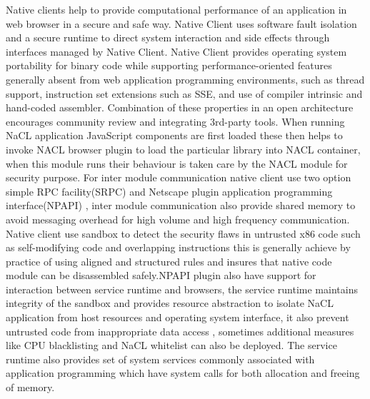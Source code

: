 \documentclass[23pt]{article}
\begin{document}
{\Large Native clients help to provide computational performance of an application in web browser in a secure and safe way. Native Client uses software fault isolation and a secure runtime to direct system interaction and side effects through interfaces managed by Native Client. Native Client provides operating system portability for binary code while supporting performance-oriented features generally absent from web application programming environments, such as thread support, instruction set extensions such as SSE, and use of compiler intrinsic and hand-coded assembler. Combination of these properties in an open architecture encourages community review and integrating 3rd-party tools. When running NaCL application JavaScript components are first loaded these then helps to invoke NACL browser plugin to load the particular library into NACL container, when this module runs their behaviour is taken care by the NACL module for security purpose. For inter module communication native client use two option simple RPC facility(SRPC) and Netscape plugin application programming interface(NPAPI) , inter module communication also provide shared memory to avoid messaging overhead for high volume and high frequency communication. Native client use sandbox to detect the security flaws in untrusted x86 code such as self-modifying code and overlapping instructions this is generally achieve by practice of using aligned and structured rules and insures that native code module can be disassembled safely.NPAPI plugin also have support for interaction between service runtime and browsers, the service runtime maintains integrity of the sandbox and provides resource abstraction to isolate NaCL application from host resources and operating system interface, it also prevent untrusted code from inappropriate data access , sometimes additional measures like CPU blacklisting and NaCL whitelist can also be deployed. The service runtime also provides set of system services commonly associated with application programming which have system calls for both allocation and freeing of  memory.\\ \\
}
\end{document}
